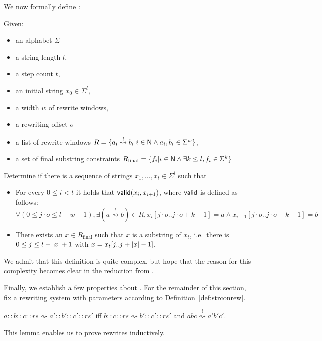 \documentclass[a4paper,UKenglish,cleveref, autoref]{lipics-v2019}
\newcommand{\strent}{\rightsquigarrow}
\newcommand{\constrent}{\overset{!}{\rightsquigarrow}}
\newcommand{\Rfinal}{R_{\text{final}}}
\begin{document}
We now formally define \strconrew{}:
\begin{definition}\label{def:strconrew}
  Given: 
  \begin{itemize}
    \item an alphabet $\Sigma$
    \item a string length $l$,
    \item a step count $t$,
    \item an initial string $x_0 \in \Sigma^l$,
    \item a width $w$ of rewrite windows, 
    \item a rewriting offset $o$
    \item a list of rewrite windows $R = \{a_i \constrent b_i | i \in \nat \land a_i, b_i \in \Sigma^w\}$,
    \item a set of final substring constraints $\Rfinal = \{f_i | i \in \nat \land \exists k \le l, f_i \in \Sigma^k\}$
  \end{itemize}

  Determine if there is a sequence of strings $x_1, \ldots, x_t \in \Sigma^l$ such that 
  \begin{itemize}
    \item For every $0 \le i < t$ it holds that $\textsf{valid}(x_i, x_{i+1})$, where $\textsf{valid}$ is defined as follows:
      \[\forall (0 \le j\cdot o \le l -w + 1), \exists (a \constrent b) \in R, x_i[j\cdot o..j\cdot o+ k-1] = a \land x_{i+1}[j\cdot o..j\cdot o+k-1] = b \]
    \item There exists an $x \in \Rfinal$ such that $x$ is a substring of $x_t$, i.e.\ there is $0 \le j \le l - |x| + 1$ with $x = x_t[j..j+|x| - 1]$.
  \end{itemize}
\end{definition}

We admit that this definition is quite complex, but hope that the reason for this complexity becomes clear in the reduction from \gennp{}.

Finally, we establish a few properties about \strconrew{}. For the remainder of this section, fix a rewriting system with parameters according to Definition~\ref{def:strconrew}.

\begin{lemma}\label{lem:rewind}
  $a :: b :: c :: rs \strent{} a' :: b' :: c' :: rs'$ iff $b :: c :: rs \strent{} b' :: c' :: rs'$ and $abc \constrent{} a'b'c'$. 
\end{lemma}
This lemma enables us to prove rewrites inductively.
\end{document}
